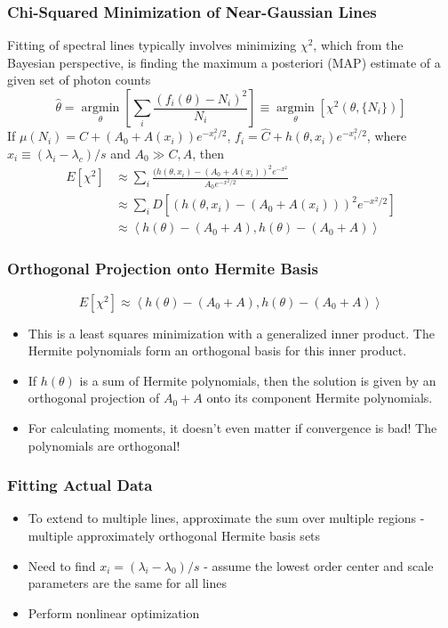 \documentclass{beamer}
\begin{document}
\begin{frame}
	\frametitle{Chi-Squared Minimization of Near-Gaussian Lines}
	Fitting of spectral lines typically involves minimizing \(\chi^2\), which from the Bayesian perspective, is finding the maximum a posteriori (MAP) estimate of a given set of photon counts
	\begin{equation}
	\hat{\theta} = \underset{\theta}{\operatorname{argmin}} \left[\sum_{i} \frac{(f_i(\theta) - N_i)^2}{N_i}\right] \equiv \underset{\theta}{\operatorname{argmin}} \left[\chi^2(\theta, \{N_i\})\right]
	\end{equation}
	If \(\mu(N_i) = C + (A_0+A(x_i))e^{-x_i^2/2} \), \(f_i = \hat{C} + h(\theta, x_i) e^{-x_i^2/2}\), where \(x_i \equiv (\lambda_i - \lambda_c)/s\) and \(A_0\gg C, A\), then
	\begin{align}
	E[\chi^2] &\approx \sum_{i} \frac{(h(\theta, x_i) - (A_0 + A(x_i))^2 e^{-x^2}}{A_0 e^{-x^2/2}} \\
	&\approx \sum_{i} D \left[(h(\theta, x_i) - (A_0 + A(x_i)))^2 e^{-x^2/2}\right] \\
	&\approx \left<h(\theta) - (A_0 + A), h(\theta)-(A_0 + A) \right>
	\end{align}
\end{frame}

\begin{frame}
	\frametitle{Orthogonal Projection onto Hermite Basis}
	\begin{equation}
	E[\chi^2] \approx \left<h(\theta) - (A_0 + A), h(\theta)-(A_0 + A) \right>
	\end{equation}
	\begin{itemize}
		\item This is a least squares minimization with a generalized inner product. The Hermite polynomials form an orthogonal basis for this inner product.
		\item If \(h(\theta)\) is a sum of Hermite polynomials, then the solution is given by an orthogonal projection of \(A_0 + A\) onto its component Hermite polynomials.
		\item For calculating moments, it doesn't even matter if convergence is bad! The polynomials are orthogonal!
	\end{itemize}
\end{frame}

\begin{frame}
	\frametitle{Fitting Actual Data}
	\begin{itemize}
		\item To extend to multiple lines, approximate the sum over multiple regions - multiple approximately orthogonal Hermite basis sets
		\item Need to find \(x_i = (\lambda_i - \lambda_0)/s\) - assume the lowest order center and scale parameters are the same for all lines
		\item Perform nonlinear optimization
	\end{itemize}
\end{frame}
\end{document}

